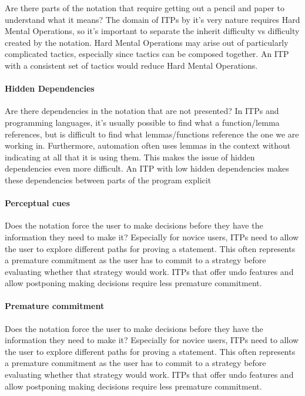 \documentclass[
]{article}
\begin{document}
Are there parts of the notation that require getting out a pencil and
paper to understand what it means? The domain of ITPs by it's very
nature requires Hard Mental Operations, so it's important to separate
the inherit difficulty vs difficulty created by the notation. Hard
Mental Operations may arise out of particularly complicated tactics,
especially since tactics can be composed together. An ITP with a
consistent set of tactics would reduce Hard Mental Operations.

\hypertarget{hidden-dependencies}{%
\paragraph{Hidden Dependencies}\label{hidden-dependencies}}

Are there dependencies in the notation that are not presented? In ITPs
and programming languages, it's usually possible to find what a
function/lemma references, but is difficult to find what
lemmas/functions reference the one we are working in. Furthermore,
automation often uses lemmas in the context without indicating at all
that it is using them. This makes the issue of hidden dependencies even
more difficult. An ITP with low hidden dependencies makes these
dependencies between parts of the program explicit

\hypertarget{perceptual-cues}{%
\paragraph{Perceptual cues}\label{perceptual-cues}}

Does the notation force the user to make decisions before they have the
information they need to make it? Especially for novice users, ITPs need
to allow the user to explore different paths for proving a statement.
This often represents a premature commitment as the user has to commit
to a strategy before evaluating whether that strategy would work. ITPs
that offer undo features and allow postponing making decisions require
less premature commitment.

\hypertarget{premature-commitment}{%
\paragraph{Premature commitment}\label{premature-commitment}}

Does the notation force the user to make decisions before they have the
information they need to make it? Especially for novice users, ITPs need
to allow the user to explore different paths for proving a statement.
This often represents a premature commitment as the user has to commit
to a strategy before evaluating whether that strategy would work. ITPs
that offer undo features and allow postponing making decisions require
less premature commitment.
\end{document}
